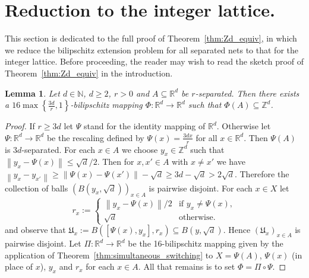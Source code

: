 \documentclass[a4paper, bibliography=totoc]{scrartcl}
\newtheorem{lemma}[define]{Lemma}
\numberwithin{claimcounter}{define}
\newcommand{\R}{\mathbb{R}}
\newcommand{\Z}{\mathbb{Z}}
\newcommand{\N}{\mathbb{N}}
\newcommand{\enorm}[1]{\left\|#1\right\|}
\newcommand{\mf}[1]{\mathfrak{#1}}
\newcommand{\set}[1]{\left\{#1\right\}}
\begin{document}
\section{Reduction to the integer lattice.}\label{s:generalise}
This section is dedicated to the full proof of Theorem~\ref{thm:Zd_equiv}, in which we reduce the bilipschitz extension problem for all separated nets to that for the integer lattice. Before proceeding, the reader may wish to read the sketch proof of Theorem~\ref{thm:Zd_equiv} in the introduction.
\begin{lemma}\label{lemma:rounding_to_integers}
	Let $d\in\N$, $d\geq 2$, $r>0$ and $A\subseteq \R^{d}$ be $r$-separated. Then there exists a $16\max\set{\frac{3d}{r},1}$-bilipschitz mapping $\Phi\colon \R^{d}\to\R^{d}$ such that $\Phi(A)\subseteq \Z^{d}$.
\end{lemma}
\begin{proof}
	If $r\geq3d$ let $\Psi$ stand for the identity mapping of $\R^{d}$. Otherwise let $\Psi\colon\R^{d}\to\R^{d}$ be the rescaling defined by $\Psi(x)=\frac{3dx}{r}$ for all $x\in\R^{d}$. Then $\Psi(A)$ is $3d$-separated. For each $x\in A$ we choose $y_{x}\in \Z^{d}$ such that $\enorm{y_{x}-\Psi(x)}\leq\sqrt{d}/2$. Then for $x,x'\in A$ with $x\neq x'$ we have $\enorm{y_{x}-y_{x'}}\geq \enorm{\Psi(x)-\Psi(x')}-\sqrt{d}\geq 3d-\sqrt{d}> 2\sqrt{d}$. Therefore the collection of balls $(B(y_{x},\sqrt{d}))_{x\in A}$ is pairwise disjoint. For each $x\in X$ let 
	\begin{equation*}
	r_{x}:=\begin{cases}
	\enorm{y_{x}-\Psi(x)}/2 & \text{if }y_{x}\neq \Psi(x),\\
	\sqrt{d} & \text{otherwise.}
	\end{cases}
	\end{equation*}
	and observe that $\mf{U}_{x}:=B([\Psi(x),y_{x}],r_{x})\subseteq B(y,\sqrt{d})$. Hence $(\mf{U}_{x})_{x\in A}$ is pairwise disjoint.
	Let $\Pi\colon\R^{d}\to\R^{d}$ be the 16-bilipschitz mapping given by the application of Theorem~\ref{thm:simultaneous_switching} to $X=\Psi(A)$, $\Psi(x)$ (in place of $x$), $y_{x}$ and $r_{x}$ for each $x\in A$.
	All that remains is to set $\Phi=\Pi\circ \Psi$.
\end{proof}
\end{document}
